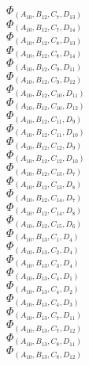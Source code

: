 \documentclass[14pt]{article}
\begin{document}
    $\Phi_{({A}_{10}, {B}_{12}, {C}_{7}, {D}_{13})}$ \\ 
    $\Phi_{({A}_{10}, {B}_{12}, {C}_{7}, {D}_{14})}$ \\ 
    $\Phi_{({A}_{10}, {B}_{12}, {C}_{8}, {D}_{13})}$ \\ 
    $\Phi_{({A}_{10}, {B}_{12}, {C}_{8}, {D}_{14})}$ \\ 
    $\Phi_{({A}_{10}, {B}_{12}, {C}_{9}, {D}_{11})}$ \\ 
    $\Phi_{({A}_{10}, {B}_{12}, {C}_{9}, {D}_{12})}$ \\ 
    $\Phi_{({A}_{10}, {B}_{12}, {C}_{10}, {D}_{11})}$ \\ 
    $\Phi_{({A}_{10}, {B}_{12}, {C}_{10}, {D}_{12})}$ \\ 
    $\Phi_{({A}_{10}, {B}_{12}, {C}_{11}, {D}_{9})}$ \\ 
    $\Phi_{({A}_{10}, {B}_{12}, {C}_{11}, {D}_{10})}$ \\ 
    $\Phi_{({A}_{10}, {B}_{12}, {C}_{12}, {D}_{9})}$ \\ 
    $\Phi_{({A}_{10}, {B}_{12}, {C}_{12}, {D}_{10})}$ \\ 
    $\Phi_{({A}_{10}, {B}_{12}, {C}_{13}, {D}_{7})}$ \\ 
    $\Phi_{({A}_{10}, {B}_{12}, {C}_{13}, {D}_{8})}$ \\ 
    $\Phi_{({A}_{10}, {B}_{12}, {C}_{14}, {D}_{7})}$ \\ 
    $\Phi_{({A}_{10}, {B}_{12}, {C}_{14}, {D}_{8})}$ \\ 
    $\Phi_{({A}_{10}, {B}_{12}, {C}_{15}, {D}_{6})}$ \\ 
    $\Phi_{({A}_{10}, {B}_{13}, {C}_{1}, {D}_{4})}$ \\ 
    $\Phi_{({A}_{10}, {B}_{13}, {C}_{2}, {D}_{4})}$ \\ 
    $\Phi_{({A}_{10}, {B}_{13}, {C}_{3}, {D}_{4})}$ \\ 
    $\Phi_{({A}_{10}, {B}_{13}, {C}_{4}, {D}_{1})}$ \\ 
    $\Phi_{({A}_{10}, {B}_{13}, {C}_{4}, {D}_{2})}$ \\ 
    $\Phi_{({A}_{10}, {B}_{13}, {C}_{4}, {D}_{3})}$ \\ 
    $\Phi_{({A}_{10}, {B}_{13}, {C}_{7}, {D}_{11})}$ \\ 
    $\Phi_{({A}_{10}, {B}_{13}, {C}_{7}, {D}_{12})}$ \\ 
    $\Phi_{({A}_{10}, {B}_{13}, {C}_{8}, {D}_{11})}$ \\ 
    $\Phi_{({A}_{10}, {B}_{13}, {C}_{8}, {D}_{12})}$ \\ 
\end{document}
